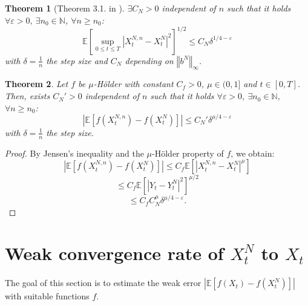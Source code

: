 \documentclass[11pt]{enstaPRE}
\newtheorem{theo}{Theorem}
\newcommand{\norme}[1]{\left\Vert #1\right\Vert}
\newcommand{\N}{\mathbb{N}}
\newcommand{\E}{\mathbb{E}}
\begin{document}
\begin{theo}[Theorem 3.1. in \cite{Leo-Szo}]\label{leo}
    $\exists C_N>0$ independent of $n$ such that it holds  $\forall \varepsilon >0,\ \exists n_0\in\N$, $\forall n\geq n_0$:
    \begin{equation}
    \E\left[\underset{0\leq t\leq T}{\sup}\left|X^{N,n}_t-X^N_t\right|^2\right]^{1/2}\leq C_N\delta^{1/4-\varepsilon}
    \end{equation}
    with $\delta=\frac{1}{n}$ the step size and $C_N$ depending on $\norme{b^N}_\infty$.
\end{theo}

\begin{theo}
    Let $f$ be $\mu$-Hölder with constant $C_f>0$, $\mu\in(0,1]$ and $t\in[0,T]$. Then, exists $C_N'>0$ independent of $n$ such that it holds  $\forall \varepsilon >0,\ \exists n_0\in\N$, $\forall n\geq n_0$:
    \begin{equation}
    \left|\E\left[f\left(X_t^{N,n}\right)-f\left(X_t^N\right)\right]\right| \leq C_N'\delta^{\mu/4-\varepsilon}
    \end{equation}                       
    with $\delta=\frac{1}{n}$ the step size.
\end{theo}

\begin{proof}
    By Jensen's inequality and the $\mu$-Hölder property of $f$, we obtain:
    \begin{equation*}
    \left|\E\left[f\left(X_t^{N,n}\right)-f\left(X_t^N\right)\right]\right| \leq C_f  \E\left[\left|X_t^{N,n}-X_t^N\right|^\mu\right]
    \end{equation*}
    \begin{equation*}
    \leq  C_f  \E\left[\left|Y_t-Y_t^N\right|^2\right]^{\mu/2}
    \end{equation*}
    \begin{equation*}
    \leq C_f  C_N^\mu\delta^{\mu/4-\varepsilon}.
    \end{equation*}
\end{proof}

\section{Weak convergence rate of $X^{N}_t$ to $X_t$}
\paragraph{}
The goal of this section is to estimate the weak error $\left|\E\left[f\left(X_t\right)-f\left(X_t^N\right)\right]\right|$ with suitable functions $f$. 
\end{document}
